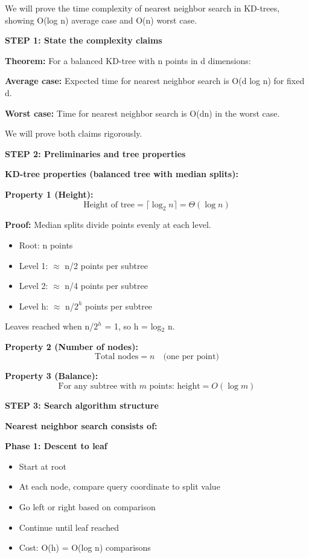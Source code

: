 \documentclass[12pt]{article}
\begin{document}
\begin{solution}
We will prove the time complexity of nearest neighbor search in KD-trees, showing O(log n) average case and O(n) worst case.

\textbf{STEP 1: State the complexity claims}

\textbf{Theorem:} For a balanced KD-tree with n points in d dimensions:

\textbf{Average case:} Expected time for nearest neighbor search is O(d log n) for fixed d.

\textbf{Worst case:} Time for nearest neighbor search is O(dn) in the worst case.

We will prove both claims rigorously.

\textbf{STEP 2: Preliminaries and tree properties}

\textbf{KD-tree properties (balanced tree with median splits):}

\textbf{Property 1 (Height):}
\[
\text{Height of tree} = \lceil \log_2 n \rceil = \Theta(\log n)
\]

\textbf{Proof:} Median splits divide points evenly at each level.
\begin{itemize}
    \item Root: n points
    \item Level 1: $\approx$ n/2 points per subtree
    \item Level 2: $\approx$ n/4 points per subtree
    \item Level h: $\approx$ n/$2^h$ points per subtree
\end{itemize}

Leaves reached when n/$2^h$ = 1, so h = log$_2$ n. \checkmark

\textbf{Property 2 (Number of nodes):}
\[
\text{Total nodes} = n \quad \text{(one per point)}
\]

\textbf{Property 3 (Balance):}
\[
\text{For any subtree with } m \text{ points: height} = O(\log m)
\]

\textbf{STEP 3: Search algorithm structure}

\textbf{Nearest neighbor search consists of:}

\textbf{Phase 1: Descent to leaf}
\begin{itemize}
    \item Start at root
    \item At each node, compare query coordinate to split value
    \item Go left or right based on comparison
    \item Continue until leaf reached
    \item Cost: O(h) = O(log n) comparisons
\end{itemize}


\end{solution}
\end{document}
